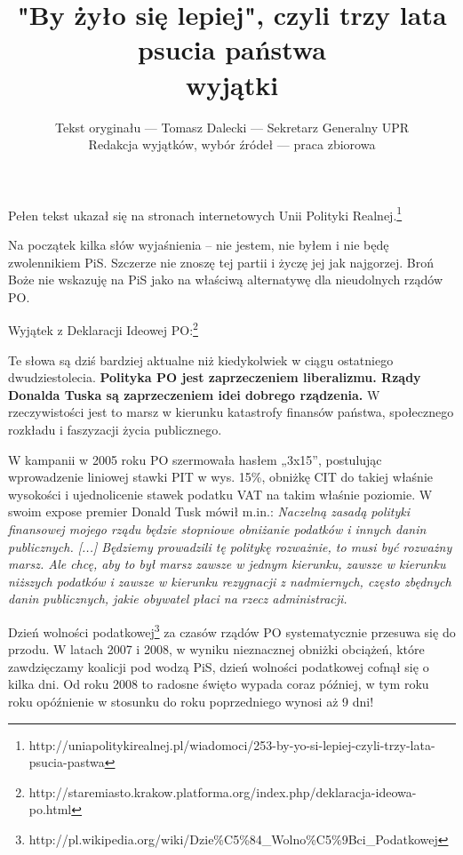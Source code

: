 \documentclass[10pt]{article}
\title{"By żyło się lepiej", czyli trzy lata psucia państwa\\wyjątki}
\author{Tekst oryginału --- Tomasz Dalecki --- Sekretarz Generalny UPR\\Redakcja wyjątków, wybór źródeł --- praca zbiorowa}
\begin{document}
\maketitle
\thispagestyle{empty}

\noindent Pełen tekst ukazał się na stronach internetowych Unii Polityki Realnej.\footnote{http://uniapolitykirealnej.pl/wiadomoci/253-by-yo-si-lepiej-czyli-trzy-lata-psucia-pastwa}

Na początek kilka słów wyjaśnienia – nie jestem, nie byłem i nie będę zwolennikiem PiS. Szczerze nie znoszę tej partii i życzę jej jak najgorzej. Broń Boże nie wskazuję na PiS jako na właściwą alternatywę dla nieudolnych rządów PO.

Wyjątek z Deklaracji Ideowej PO:\footnote{http://staremiasto.krakow.platforma.org/index.php/deklaracja-ideowa-po.html}


\noindent Te słowa są dziś bardziej aktualne niż kiedykolwiek w ciągu ostatniego dwudziestolecia. {\bf Polityka PO jest zaprzeczeniem liberalizmu. Rządy Donalda Tuska są zaprzeczeniem idei dobrego rządzenia.} W rzeczywistości jest to marsz w kierunku katastrofy finansów państwa, społecznego rozkładu i faszyzacji życia publicznego.

W kampanii w 2005 roku PO szermowała hasłem „3x15”, postulując wprowadzenie liniowej stawki PIT w wys. 15\%, obniżkę CIT do takiej właśnie wysokości i ujednolicenie stawek podatku VAT na takim właśnie poziomie. W swoim expose premier Donald Tusk mówił m.in.: {\em Naczelną zasadą polityki finansowej mojego rządu będzie stopniowe obniżanie podatków i innych danin publicznych. [...] Będziemy prowadzili tę politykę rozważnie, to musi być rozważny marsz. Ale chcę, aby to był marsz zawsze w jednym kierunku, zawsze w kierunku niższych podatków i zawsze w kierunku rezygnacji z nadmiernych, często zbędnych danin publicznych, jakie obywatel płaci na rzecz administracji.}

Dzień wolności podatkowej\footnote{http://pl.wikipedia.org/wiki/Dzie\%C5\%84\_Wolno\%C5\%9Bci\_Podatkowej} za czasów rządów PO systematycznie przesuwa się do przodu. W latach 2007 i 2008, w wyniku nieznacznej obniżki obciążeń, które zawdzięczamy koalicji pod wodzą PiS, dzień wolności podatkowej cofnął się o kilka dni. Od roku 2008 to radosne święto wypada coraz później, w tym roku roku opóźnienie w stosunku do roku poprzedniego wynosi aż 9 dni!
\end{document}
